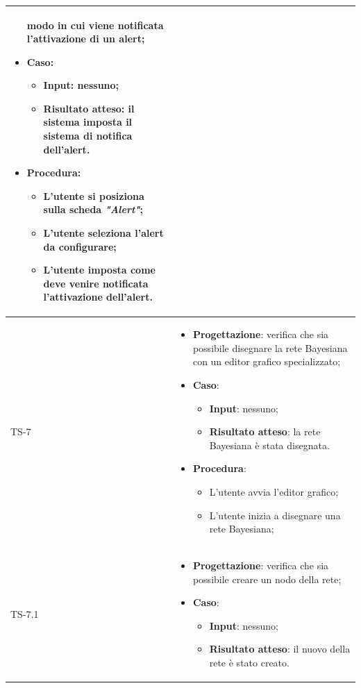 \begin{longtable}{|C{2.5cm}|C{13cm}|}
\begin{itemize}
	modo in cui viene notificata l'attivazione di un alert;
	\item \textbf{Caso}: 
	\begin{itemize}
		\item \textbf{Input}: nessuno;
		\item \textbf{Risultato atteso}: il sistema imposta il sistema di notifica dell'alert.
	\end{itemize}
	\item \textbf{Procedura}:
	\begin{itemize}
		\item L'utente si posiziona sulla scheda \emph{"Alert"};
		\item L'utente seleziona l'alert da configurare;
		\item L'utente imposta come deve venire notificata l'attivazione dell'alert.
	\end{itemize} 
\end{itemize}
	 \\
	\hline
	{TS-7} & 
\begin{itemize}
	\item \textbf{Progettazione}: verifica che sia possibile disegnare la rete
	Bayesiana con un editor grafico specializzato;
	\item \textbf{Caso}: 
	\begin{itemize}
		\item \textbf{Input}: nessuno;
		\item \textbf{Risultato atteso}: la rete Bayesiana è stata disegnata.
	\end{itemize}
	\item \textbf{Procedura}:
	\begin{itemize}
		\item L'utente avvia l'editor grafico;
		\item L'utente inizia a disegnare una rete Bayesiana;
	\end{itemize} 
\end{itemize} \\
\hline
	{TS-7.1} & 
\begin{itemize}
	\item \textbf{Progettazione}: verifica che sia possibile creare un nodo
	della rete;
	\item \textbf{Caso}: 
	\begin{itemize}
		\item \textbf{Input}: nessuno;
		\item \textbf{Risultato atteso}: il nuovo della rete è stato creato.
	\end{itemize}

\end{itemize}
\end{longtable}
